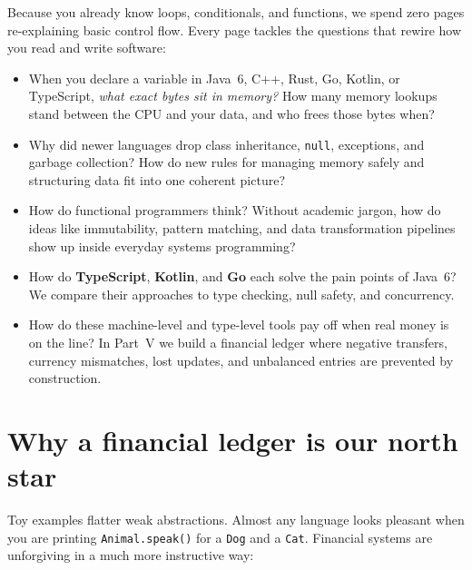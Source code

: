 Because you already know loops, conditionals, and functions, we spend zero pages re-explaining basic control flow. Every page tackles the questions that rewire how you read and write software:

\begin{itemize}
  \item When you declare a variable in Java~6, C++, Rust, Go, Kotlin, or TypeScript, \emph{what exact bytes sit in memory?} How many memory lookups stand between the CPU and your data, and who frees those bytes when?
  \item Why did newer languages drop class inheritance, \texttt{null}, exceptions, and garbage collection? How do new rules for managing memory safely and structuring data fit into one coherent picture?
  \item How do functional programmers think? Without academic jargon, how do ideas like immutability, pattern matching, and data transformation pipelines show up inside everyday systems programming?
  \item How do \textbf{TypeScript}, \textbf{Kotlin}, and \textbf{Go} each solve the pain points of Java~6? We compare their approaches to type checking, null safety, and concurrency.
  \item How do these machine-level and type-level tools pay off when real money is on the line? In Part~V we build a financial ledger where negative transfers, currency mismatches, lost updates, and unbalanced entries are prevented by construction.
\end{itemize}

\section*{Why a financial ledger is our north star}

Toy examples flatter weak abstractions. Almost any language looks pleasant when you are printing \texttt{Animal.speak()} for a \texttt{Dog} and a \texttt{Cat}. Financial systems are unforgiving in a much more instructive way:

